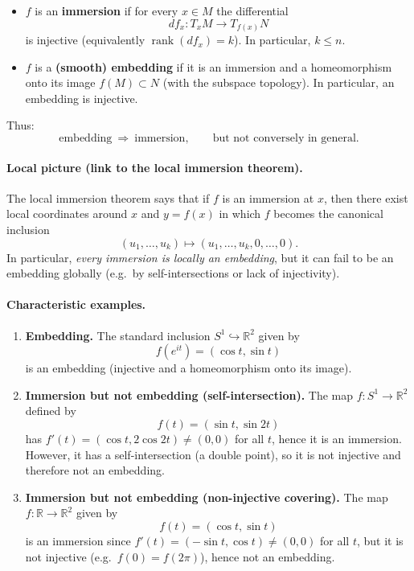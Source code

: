 \documentclass[12pt,a4paper]{article}
\theoremstyle{plain}
\theoremstyle{definition}      %
\begin{document}
\begin{itemize}
	\item $f$ is an \textbf{immersion} if for every $x\in M$ the differential
	\[
	df_x:T_xM\to T_{f(x)}N
	\]
	is injective (equivalently $\operatorname{rank}(df_x)=k$). In particular, $k\le n$.
	
	\item $f$ is a \textbf{(smooth) embedding} if it is an immersion and a homeomorphism onto its image
	$f(M)\subset N$ (with the subspace topology). In particular, an embedding is injective.
\end{itemize}

Thus:
\[
\text{embedding} \ \Longrightarrow\ \text{immersion},
\qquad
\text{but not conversely in general.}
\]

\paragraph{Local picture (link to the local immersion theorem).}
The local immersion theorem says that if $f$ is an immersion at $x$, then there exist local coordinates
around $x$ and $y=f(x)$ in which $f$ becomes the canonical inclusion
\[
(u_1,\dots,u_k)\longmapsto (u_1,\dots,u_k,0,\dots,0).
\]
In particular, \emph{every immersion is locally an embedding}, but it can fail to be an embedding globally
(e.g.\ by self-intersections or lack of injectivity).

\paragraph{Characteristic examples.}
\begin{enumerate}
	\item \textbf{Embedding.}
	The standard inclusion $S^1\hookrightarrow \mathbb{R}^2$ given by
	\[
	f(e^{it})=(\cos t,\sin t)
	\]
	is an embedding (injective and a homeomorphism onto its image).
	
	\item \textbf{Immersion but not embedding (self-intersection).}
	The map $f:S^1\to\mathbb{R}^2$ defined by
	\[
	f(t)=(\sin t,\sin 2t)
	\]
	has $f'(t)=(\cos t,2\cos 2t)\neq (0,0)$ for all $t$, hence it is an immersion.
	However, it has a self-intersection (a double point), so it is not injective and therefore not an embedding.
	
	\item \textbf{Immersion but not embedding (non-injective covering).}
	The map $f:\mathbb{R}\to\mathbb{R}^2$ given by
	\[
	f(t)=(\cos t,\sin t)
	\]
	is an immersion since $f'(t)=(-\sin t,\cos t)\neq (0,0)$ for all $t$,
	but it is not injective (e.g.\ $f(0)=f(2\pi)$), hence not an embedding.
\end{enumerate}
\end{document}
